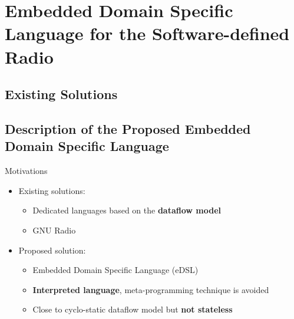 
\section[eDSL for the SDR]{Embedded Domain Specific Language for the Software-defined Radio}

\subsection[Existing Solutions]{Existing Solutions}

\subsection[Proposed eDSL]{Description of the Proposed Embedded Domain Specific Language}

\begin{frame}{Motivations}
  \vfill
  \begin{itemize}
    \item Existing solutions:
    \begin{itemize}
      \item Dedicated languages based on the \textbf{dataflow model}~\cite{Dennis1980,Engels1994}
      \item GNU Radio~\cite{GNURadio}
    \end{itemize}
    \vspace{0.3cm}
    \pause
    \item Proposed solution:
    \begin{itemize}
      \item \Cxx Embedded Domain Specific Language (eDSL)
      \item \textbf{Interpreted language}, meta-programming technique is avoided
      \item Close to cyclo-static dataflow model but \textbf{not stateless}
    \end{itemize}
  \end{itemize}
  \vfill
\end{frame}

